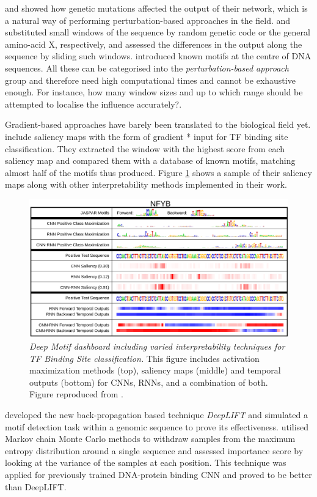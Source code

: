 \cite{Alipanahi2015} and \cite{Zhou2015} showed how genetic mutations affected the output of their network, which is a natural way of performing perturbation-based approaches in the field. \cite{Umarov2017} and \cite{Fontal2017} substituted small windows of the sequence by random genetic code or the general amino-acid X, respectively, and assessed the differences in the output along the sequence by sliding such windows. \cite{Kelley2016} introduced known motifs at the centre of DNA sequences. All these can be categorised into the \textit{perturbation-based approach} group and therefore need high computational times and cannot be exhaustive enough. For instance, how many window sizes and up to which range should be attempted to localise the influence accurately?.

Gradient-based approaches have barely been translated to the biological field yet. \cite{Lanchantin2016} include saliency maps with the form of gradient * input for TF binding site classification. They extracted the window with the highest score from each saliency map and compared them with a database of known motifs, matching almost half of the motifs thus produced. Figure \ref{fig:demo} shows a sample of their saliency maps along with other interpretability methods implemented in their work.

\begin{figure}
	\centering
	\includegraphics[width=0.8\linewidth]{Figures/demo}
	\caption{\textit{Deep Motif dashboard including varied interpretability techniques for TF Binding Site classification.} This figure includes activation maximization methods (top), saliency maps (middle) and temporal outputs (bottom) for CNNs, RNNs, and a combination of both. Figure reproduced from \cite{Lanchantin2016}.}
	\label{fig:demo}
\end{figure}

\cite{Shrikumar2017} developed the new back-propagation based technique \textit{DeepLIFT} and simulated a motif detection task within a genomic sequence to prove its effectiveness. \cite{Finnegan2017} utilised Markov chain Monte Carlo methods to withdraw samples from the maximum entropy distribution around a single sequence and assessed importance score by looking at the variance of the samples at each position. This technique was applied for previously trained DNA-protein binding CNN and proved to be better than DeepLIFT.

